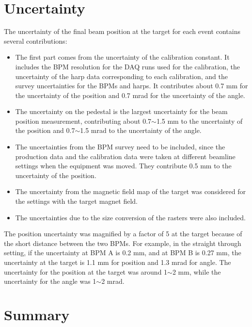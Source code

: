 \documentclass[english,review,number,sort&compress]{elsarticle}
\begin{document}
\section{Uncertainty}

The uncertainty of the final beam position at the target for each event contains several contributions: 
\begin{itemize}
\item The first part comes from the uncertainty of the calibration constant. It includes the BPM resolution for the DAQ runs used for the calibration, the uncertainty of the harp data corresponding to each calibration, and the survey uncertainties for the BPMs and harps. It contributes about 0.7 mm for the uncertainty of the position and 0.7 mrad for the uncertainty of the angle. 
\item The uncertainty on the pedestal is the largest uncertainty for the beam position measurement, contributing about 0.7$\sim$1.5 mm to the uncertainty of the position and 0.7$\sim$1.5 mrad to the uncertainty of the angle. 
\item The uncertainties from the BPM survey need to be included, since the production data and the calibration data were taken at different beamline settings when the equipment was moved. They contribute 0.5 mm to the uncertainty of the position. 
\item The uncertainty from the magnetic field map of the target was considered for the settings with the target magnet field. 
\item The uncertainties due to the size conversion of the rasters were also included. 
\end{itemize}
The position uncertainty was magnified by a factor of 5 at the target because of the short distance between the two BPMs. For example, in the straight through setting, if the uncertainty at BPM A is 0.2 mm, and at BPM B is 0.27 mm, the uncertainty at the target is 1.1 mm for position and 1.3 mrad for angle. The uncertainty for the position at the target was around 1$\sim$2 mm, while the uncertainty for the angle was 1$\sim$2 mrad.


\section{Summary}
\end{document}
